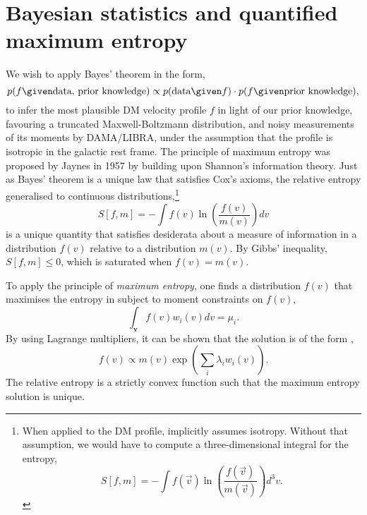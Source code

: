\documentclass{article}
\begin{document}
\section{Bayesian statistics and quantified maximum entropy}\label{sec:maxent}

We wish to apply Bayes' theorem in the form,
\begin{equation}\label{eq:bayes}
p(f\given \text{data, prior knowledge}) \propto
p(\text{data}\given f) \cdot p(f\given \text{prior knowledge}),
\end{equation}
to infer the most plausible DM velocity profile $f$ in light of our prior knowledge, favouring a truncated Maxwell-Boltzmann distribution, and noisy measurements of its moments by DAMA/LIBRA, under the assumption that the profile is isotropic in the galactic rest frame. The principle of maximum entropy was proposed by Jaynes in 1957\cite{PhysRev.106.620} by building upon Shannon's information theory\cite{BLTJ:BLTJ1338}. Just as Bayes' theorem is a unique law that satisfies Cox's axioms, the relative entropy generalised to continuous distributions,\footnote{When applied to the DM profile,  implicitly assumes isotropy. Without that assumption, we would have to compute a three-dimensional integral for the entropy,
\begin{equation*}
S[f, m] = - \int f(\vec v) \ln \left(\frac{f(\vec v)}{m(\vec v)}\right) d^3v.
\end{equation*}
}
\begin{equation}\label{eq:entropy}
S[f, m] = - \int f(v) \ln \left(\frac{f(v)}{m(v)}\right) dv
\end{equation}
is a unique quantity that satisfies desiderata about a measure of information in a distribution $f(v)$ relative to a distribution $m(v)$. By Gibbs' inequality, $S[f, m] \le 0$, which is saturated when $f(v) = m(v)$.

To apply the principle of \emph{maximum entropy}, one finds a distribution $f(v)$ that maximises the entropy in  subject to moment constraints on $f(v)$,
\begin{equation}
\int_{\mathbf v} f(v) w_i(v) dv = \mu_i.
\end{equation}
By using Lagrange multipliers, it can be shown that the solution is of the form ,
\begin{equation}\label{eq:me}
f(v) \propto m(v) \exp\left(\sum_i \lambda_i w_i(v)\right).
\end{equation}
The relative entropy is a strictly convex function such that the maximum entropy solution is unique.
\end{document}
